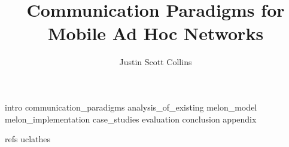 \documentclass [PhD] {uclathes}
\title          {Communication Paradigms for Mobile Ad Hoc Networks}
\author         {Justin Scott Collins}
\begin{document}
\makeintropages


 {intro}
 {communication_paradigms}
 {analysis_of_existing}
 {melon_model}
 {melon_implementation}
 {case_studies}
 {evaluation}
 {conclusion}
 {appendix}

 {refs}    %
 {uclathes}
\end{document}

